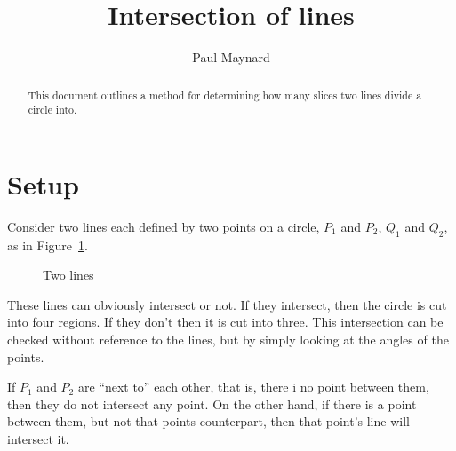 \documentclass[twocolumn]{article}
\title{Intersection of lines}
\author{Paul Maynard}
\begin{document}
\maketitle

\begin{abstract}
This document outlines a method for determining how many slices two lines divide a circle into.
\end{abstract}

\section{Setup}
Consider two lines each defined by two points on a circle,
$P_1$ and $P_2$, $Q_1$ and $Q_2$, as in Figure~\ref{fig:2lines}. 

\vspace{1pc}

\begin{figure}[h]
\centering
\caption{Two lines}
\label{fig:2lines}
\end{figure}

These lines can obviously intersect or not. If they intersect, then the circle is cut into four regions.
If they don't then it is cut into three. This intersection can be checked 
without reference to the lines, but by simply looking at the angles of the points.

If $P_1$ and $P_2$ are ``next to'' each other, that is, there i no point between them, then they do not intersect any point.
On the other hand, if there is a point between them, but not that points counterpart, then that point's line will intersect it.
\end{document}
